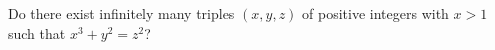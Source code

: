 Do there exist infinitely many triples $(x,y,z)$ of positive integers with $x>1$ such that $x^3+y^2=z^2$?
